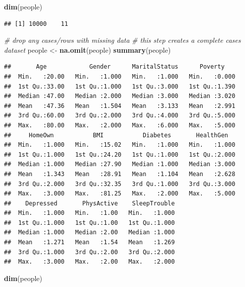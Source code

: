 \documentclass[]{article}
\newenvironment{Shaded}{\begin{snugshade}}{\end{snugshade}}
\newcommand{\KeywordTok}[1]{\textcolor[rgb]{0.13,0.29,0.53}{\textbf{{#1}}}}
\newcommand{\StringTok}[1]{\textcolor[rgb]{0.31,0.60,0.02}{{#1}}}
\newcommand{\CommentTok}[1]{\textcolor[rgb]{0.56,0.35,0.01}{\textit{{#1}}}}
\newcommand{\NormalTok}[1]{{#1}}
\begin{document}
\begin{Shaded}
\begin{Highlighting}[]
\KeywordTok{dim}\NormalTok{(people)}
\end{Highlighting}
\end{Shaded}

\begin{verbatim}
## [1] 10000    11
\end{verbatim}

\begin{Shaded}
\begin{Highlighting}[]
\CommentTok{# drop any cases/rows with missing data}
\CommentTok{# this step creates a complete cases dataset}
\NormalTok{people <-}\StringTok{ }\KeywordTok{na.omit}\NormalTok{(people)}
\KeywordTok{summary}\NormalTok{(people)}
\end{Highlighting}
\end{Shaded}

\begin{verbatim}
##       Age            Gender      MaritalStatus      Poverty     
##  Min.   :20.00   Min.   :1.000   Min.   :1.000   Min.   :0.000  
##  1st Qu.:33.00   1st Qu.:1.000   1st Qu.:3.000   1st Qu.:1.390  
##  Median :47.00   Median :2.000   Median :3.000   Median :3.020  
##  Mean   :47.36   Mean   :1.504   Mean   :3.133   Mean   :2.991  
##  3rd Qu.:60.00   3rd Qu.:2.000   3rd Qu.:4.000   3rd Qu.:5.000  
##  Max.   :80.00   Max.   :2.000   Max.   :6.000   Max.   :5.000  
##     HomeOwn           BMI           Diabetes       HealthGen    
##  Min.   :1.000   Min.   :15.02   Min.   :1.000   Min.   :1.000  
##  1st Qu.:1.000   1st Qu.:24.20   1st Qu.:1.000   1st Qu.:2.000  
##  Median :1.000   Median :27.90   Median :1.000   Median :3.000  
##  Mean   :1.343   Mean   :28.91   Mean   :1.104   Mean   :2.628  
##  3rd Qu.:2.000   3rd Qu.:32.35   3rd Qu.:1.000   3rd Qu.:3.000  
##  Max.   :3.000   Max.   :81.25   Max.   :2.000   Max.   :5.000  
##    Depressed       PhysActive    SleepTrouble  
##  Min.   :1.000   Min.   :1.00   Min.   :1.000  
##  1st Qu.:1.000   1st Qu.:1.00   1st Qu.:1.000  
##  Median :1.000   Median :2.00   Median :1.000  
##  Mean   :1.271   Mean   :1.54   Mean   :1.269  
##  3rd Qu.:1.000   3rd Qu.:2.00   3rd Qu.:2.000  
##  Max.   :3.000   Max.   :2.00   Max.   :2.000
\end{verbatim}

\begin{Shaded}
\begin{Highlighting}[]
\KeywordTok{dim}\NormalTok{(people)}
\end{Highlighting}
\end{Shaded}
\end{document}
